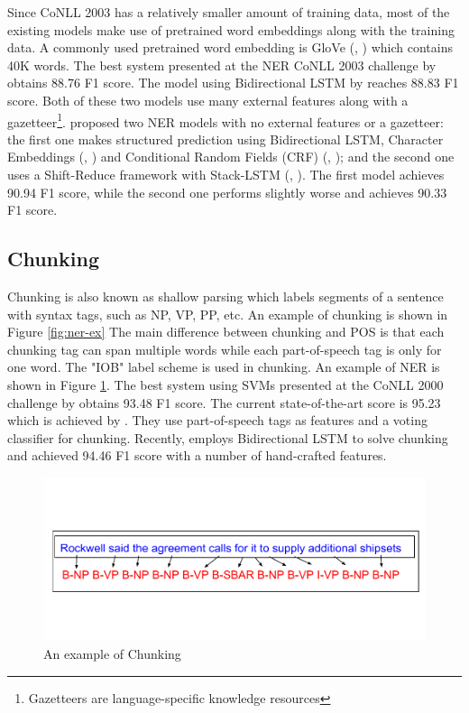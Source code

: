 Since CoNLL 2003 has a relatively smaller amount of training data, most of the existing models make use of pretrained word embeddings along with the training data. A commonly used pretrained word embedding is GloVe (\citeauthor{pennington2014glove}, \citeyear{pennington2014glove}) which contains 40K words. The best system presented at the NER CoNLL 2003 challenge by \cite{florian2003named} obtains 88.76 F1 score. The model using Bidirectional LSTM by \cite{huang2015bidirectional} reaches 88.83 F1 score. Both of these two models use many external features along with a gazetteer\footnote{Gazetteers are language-specific knowledge resources}. \cite{lample2016neural} proposed two NER models with no external features or a gazetteer: the first one makes structured prediction using Bidirectional LSTM, Character Embeddings (\citeauthor{ling2015finding}, \citeyear{ling2015finding}) and Conditional Random Fields (CRF) (\citeauthor{lafferty2001conditional}, \citeyear{lafferty2001conditional}); and the second one uses a Shift-Reduce framework with Stack-LSTM (\citeauthor{dyer2015transition}, \citeyear{dyer2015transition}). The first model achieves 90.94 F1 score, while the second one performs slightly worse and achieves 90.33 F1 score. 

\subsection{Chunking}

Chunking is also known as shallow parsing which labels segments of a sentence with syntax tags, such as NP, VP, PP, etc.  An example of chunking is shown in Figure \ref{fig:ner-ex} The main difference between chunking and POS is that each chunking tag can span multiple words while each part-of-speech tag is only for one word. The "IOB" label scheme is used in chunking. An example of NER is shown in Figure \ref{fig:chunk-ex}. The best system using SVMs presented at the CoNLL 2000 challenge by \cite{Kudoh:2000:USV:1117601.1117635} obtains 93.48 F1 score. The current state-of-the-art score is 95.23 which is achieved by \cite{shen2005voting}. They use part-of-speech tags as features and a voting classifier for chunking. Recently, \cite{huang2015bidirectional} employs Bidirectional LSTM to solve chunking and achieved 94.46 F1 score with a number of hand-crafted features.
\begin{figure}
  \centering
  \includegraphics[scale=0.8]{Chunkingex.pdf}
 \caption{An example of Chunking}
  \label{fig:chunk-ex}
\end{figure}

